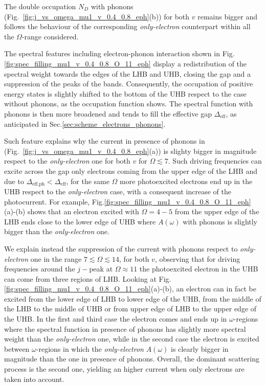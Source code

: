 \documentclass[aps,prb,groupedaddress,showpacs,twocolumn,superscriptaddress,10pt]{revtex4-2}
\begin{document}
The double occupation $N_D$ with phonons (Fig.~\ref{fig:j_vs_omega_mu1_v_0.4_0.8_eph}(b)) for both $v$ remains bigger and follows the behaviour of the corresponding \emph{only-electron} counterpart within all the $\Omega$-range considered.


The spectral features including electron-phonon interaction shown in Fig.\ref{fig:spec_filling_mu1_v_0.4_0.8_O_11_eph} display a redistribution of the spectral weight towards the edges of the LHB and UHB, closing the gap and a suppression of the peaks of the bands. Consequently, the occupation of positive energy states is slightly shifted to the bottom of the UHB respect to the case without phonons, as the occupation function shows. The spectral function with phonons is then more broadened and tends to fill the effective gap $\Delta_{\textrm{eff}}$, as anticipated in Sec.\ref{sec:scheme_electrons_phonons}. 
 
Such feature explains why the current in presence of phonons in (Fig.~\ref{fig:j_vs_omega_mu1_v_0.4_0.8_eph}(a)) is slighty bigger in magnitude respect to the \emph{only-electron} one for both $v$ for $\Omega\lesssim7$. Such driving frequencies can excite across the gap only electrons coming from the upper edge of the LHB and due to $\Delta_{\textrm{eff,ph}}<\Delta_{\textrm{eff}}$, for the same $\Omega$ more photoexcited electrons end up in the UHB respect to the \emph{only-electron} case, with a consequent increase of the photocurrent. For example, Fig.\ref{fig:spec_filling_mu1_v_0.4_0.8_O_11_eph}(a)-(b) shows that an electron excited with $\Omega=4-5$ from the upper edge of the LHB ends close to the lower edge of UHB where $A(\omega)$ with phonons is slightly bigger than the \emph{only-electron} one.


We explain instead the suppression of the current with phonons respect to \emph{only-electron} one in the range $7\lesssim\Omega\lesssim14$, for both $v$, observing that for driving frequencies around the $j-$peak at $\Omega\approx 11$ the photoexcited electron in the UHB can come from three regions of LHB. Looking at Fig. \ref{fig:spec_filling_mu1_v_0.4_0.8_O_11_eph}(a)-(b), an electron can in fact be excited from the lower edge of LHB to lower edge of the UHB, from the middle of the LHB to the middle of UHB or from upper edge of LHB to the upper edge of the UHB. In the first and third case the electron comes and ends up in $\omega$-regions where the spectral function in presence of phonons has slightly more spectral weight than the \emph{only-electron} one, while in the second case the electron is excited between $\omega$-regions in which the \emph{only-electron} $A(\omega)$ is clearly bigger in magnitude than the one in presence of phonons. Overall, the dominant scattering process is the second one, yielding an higher current when only electrons are taken into account.
\end{document}
